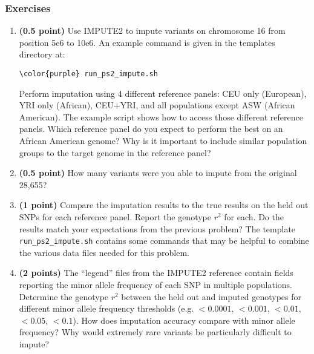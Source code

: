 \documentclass[12pt]{article}
\begin{document}
\subsubsection*{Exercises}
\begin{enumerate}

\item \textbf{(0.5 point)} Use IMPUTE2 to impute variants on chromosome 16 from position 5e6 to 10e6. An example command is given in the templates directory at:
\begin{Verbatim}[commandchars=\\\{\}]
\color{purple} run_ps2_impute.sh
\end{Verbatim}
Perform imputation using 4 different reference panels: CEU only (European), YRI only (African), CEU+YRI, and all populations except ASW (African American). The example script shows how to access those different reference panels. Which reference panel do you expect to perform the best on an African American genome? Why is it important to include similar population groups to the target genome in the reference panel?

\item \textbf{(0.5 point)} How many variants were you able to impute from the original 28,655?

\item \textbf{(1 point)} Compare the imputation results to the true results on the held out SNPs for each reference panel. Report the genotype $r^2$ for each. Do the results match your expectations from the previous problem? The template \texttt{run\_ps2\_impute.sh} contains some commands that may be helpful to combine the various data files needed for this problem.

\item \textbf{(2 points)} The ``legend'' files from the IMPUTE2 reference contain fields reporting the minor allele frequency of each SNP in multiple populations. Determine the genotype $r^2$ between the held out and imputed genotypes for different minor allele frequency thresholds (e.g. $<0.0001$, $<0.001$, $<0.01$, $<0.05$, $<0.1$). How does imputation accuracy compare with minor allele frequency? Why would extremely rare variants be particularly difficult to impute?

\end{enumerate}
\end{document}
